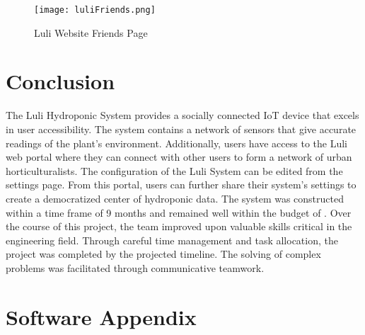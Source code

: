 \documentclass[12pt]{article} %
\begin{document}
\begin{figure}[H]
  \centering
  \texttt{[image: luliFriends.png]}
  \caption{Luli Website Friends Page}
  \label{fig: friends page}
\end{figure}

\section{Conclusion}

The Luli Hydroponic System provides a socially connected IoT device that excels in user accessibility. The system contains a network of sensors that give accurate readings of the plant's environment. Additionally, users have access to the Luli web portal where they can connect with other users to form a network of urban horticulturalists. The configuration of the Luli System can be edited from the settings page. From this portal, users can further share their system's settings to create a democratized center of hydroponic data. The system was constructed within a time frame of 9 months and remained well within the budget of . Over the course of this project, the team improved upon valuable skills critical in the engineering field. Through careful time management and task allocation, the project was completed by the projected timeline. The solving of complex problems was facilitated through communicative teamwork. 

\pagebreak

\appendix

\section{Software Appendix}
\end{document}
